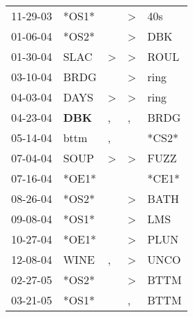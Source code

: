 \begin{supertabular}{p{0.07\textwidth}p{0.06\textwidth}p{0.02\textwidth}p{0.02\textwidth}p{0.06\textwidth}}
          11-29-03\textsuperscript{} &                            *OS1* &               &     \textgreater &            40s\textsuperscript{} \\
          01-06-04\textsuperscript{} &                            *OS2* &               &     \textgreater &            DBK\textsuperscript{} \\
          01-30-04\textsuperscript{} &           SLAC\textsuperscript{} &  \textgreater &     \textgreater &           ROUL\textsuperscript{} \\
          03-10-04\textsuperscript{} &           BRDG\textsuperscript{} &               &     \textgreater &           ring\textsuperscript{} \\
          04-03-04\textsuperscript{} &           DAYS\textsuperscript{} &  \textgreater &     \textgreater &           ring\textsuperscript{} \\
          04-23-04\textsuperscript{} &   \textbf{DBK\textsuperscript{}} &             , &                , &           BRDG\textsuperscript{} \\
          05-14-04\textsuperscript{} &           bttm\textsuperscript{} &             , &                  &                            *CS2* \\
          07-04-04\textsuperscript{} &           SOUP\textsuperscript{} &  \textgreater &     \textgreater &           FUZZ\textsuperscript{} \\
          07-16-04\textsuperscript{} &                            *OE1* &               &                  &                            *CE1* \\
          08-26-04\textsuperscript{} &                            *OS2* &               &     \textgreater &           BATH\textsuperscript{} \\
          09-08-04\textsuperscript{} &                            *OS1* &               &     \textgreater &            LMS\textsuperscript{} \\
          10-27-04\textsuperscript{} &                            *OE1* &               &     \textgreater &           PLUN\textsuperscript{} \\
          12-08-04\textsuperscript{} &           WINE\textsuperscript{} &             , &     \textgreater &           UNCO\textsuperscript{} \\
          02-27-05\textsuperscript{} &                            *OS2* &               &     \textgreater &           BTTM\textsuperscript{} \\
          03-21-05\textsuperscript{} &                            *OS1* &               &                , &           BTTM\textsuperscript{} \\

\end{supertabular}
